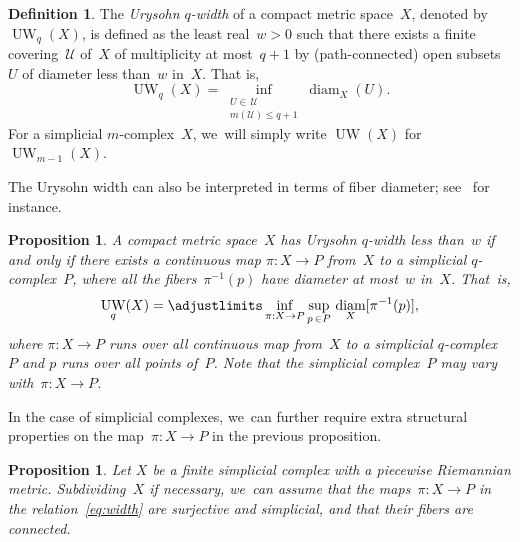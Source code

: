 \documentclass[JEP,XML,SOM,Unicode,NoFloatCountersInSection,published]{cedram}
\newtheorem{proposition}[theorem]{Proposition}
\theoremstyle{definition}
\newtheorem{definition}[theorem]{Definition}
\DeclareMathOperator\diam{diam}
\DeclareMathOperator{\UW}{UW}
\begin{document}
\begin{definition} \label{def:UW}
The \emph{Urysohn $q$-width} of a compact metric space~$X$, denoted by $\UW_q(X)$, is defined as the least real~$w >0$ such that there exists a finite covering~$\mathcal{U}$ of~$X$ of multiplicity at most~$q+1$ by (path-connected) open subsets~$U$ of diameter less than~$w$ in~$X$.
That is,
\[
\UW_q(X) = \inf_{\substack{U \in \, \mathcal{U} \\ m(\mathcal{U}) \leq q+1}} \diam_X(U).
\]
For a simplicial $m$\nobreakdash-complex~$X$, we~will simply write $\UW(X)$ for~$\UW_{m-1}(X)$.
\end{definition}

The Urysohn width can also be interpreted in terms of fiber diameter; see~\cite[Lem.\,0.8]{Guth17} for instance.

\begin{proposition} \label{prop:UW}
A compact metric space~$X$ has Urysohn $q$-width less than~$w$ if and only if there exists a continuous map $\pi:X \to P$ from~$X$ to a simplicial $q$-complex~$P$, where all the fibers~$\pi^{-1}(p)$ have diameter at most~$w$ in~$X$.
That~is,
\begin{equation} \label{eq:width}
\UW_q(X) = \adjustlimits \inf_{\pi:X \to P} \sup_{p \, \in P} \, \diam_X [\pi^{-1}(p)],
\end{equation}
where $\pi:X \to P$ runs over all continuous map from~$X$ to a simplicial $q$-complex~$P$ and $p$ runs over all points of~$P$.
Note that the simplicial complex~$P$ may vary with~$\pi:X \to P$.
\end{proposition}

In the case of simplicial complexes, we~can further require extra structural properties on the map~$\pi:X \to P$ in the previous proposition.

\begin{proposition} \label{prop:width}
Let $X$ be a finite simplicial complex with a piecewise Riemannian metric.
Subdividing~$X$ if necessary, we~can assume that the maps~$\pi:X \to P$ in the relation~\eqref{eq:width} are surjective and simplicial, and that their fibers are connected.
\end{proposition}
\end{document}

